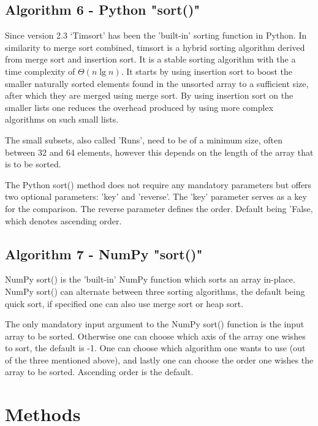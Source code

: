 \documentclass[sigconf, nonacm, natbib, screen, balance=False]{acmart}
\begin{document}
\subsection{Algorithm 6 - Python "sort()" }\label{sec:algo6}

Since version 2.3 ‘Timsort’ has been the 'built-in' sorting function in Python. In similarity to merge sort combined, timsort is a hybrid sorting algorithm derived from merge sort and insertion sort. \newline
It is a stable sorting algorithm with the a time complexity of $\Theta(n\lg n)$. It starts by using insertion sort to boost the smaller naturally sorted elements found in the unsorted array to a sufficient size, after which they are merged using merge sort. By using insertion sort on the smaller lists one reduces the overhead produced by using more complex algorithms on such small lists. 

The small subsets, also called 'Runs', need to be of a minimum size, often between 32 and 64 elements, however this depends on the length of the array that is to be sorted. 

The Python sort() method does not require any mandatory parameters but offers two optional parameters: 'key' and 'reverse'. The 'key' parameter serves as a key for the comparison. The reverse parameter defines the order. Default being 'False, which denotes ascending order.  

\subsection{Algorithm 7 - NumPy "sort()" }\label{sec:algo7}

NumPy sort() is the 'built-in' NumPy function which sorts an array in-place. NumPy sort() can alternate between three sorting algorithms, the default being quick sort, if specified one can also use merge sort or heap sort. 

The only mandatory input argument to the NumPy sort() function is the input array to be sorted. Otherwise one can choose which axis of the array one wishes to sort, the default is -1. One can choose which algorithm one wants to use (out of the three mentioned above), and lastly one can choose the order one wishes the array to be sorted. Ascending order is the default.

\section{Methods}\label{sec:methods}
\end{document}
